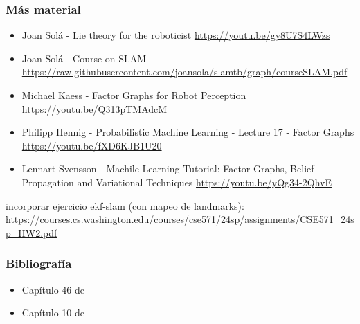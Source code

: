 \begin{frame}
    \frametitle{Más material}
    
    \begin{itemize}
        \item Joan Solá - Lie theory for the roboticist \url{https://youtu.be/gy8U7S4LWzs}
        \item Joan Solá - Course on SLAM \url{https://raw.githubusercontent.com/joansola/slamtb/graph/courseSLAM.pdf}
        \item Michael Kaess - Factor Graphs for Robot Perception \url{https://youtu.be/Q313pTMAdcM}
        \item Philipp Hennig - Probabilistic Machine Learning - Lecture 17 - Factor Graphs \url{https://youtu.be/fXD6KJB1U20}
        \item Lennart Svensson - Machile Learning Tutorial: Factor Graphs, Belief Propagation and Variational Techniques \url{https://youtu.be/yQg34-2QhvE}
    \end{itemize}

    \alert{incorporar ejercicio ekf-slam (con mapeo de landmarks): \url{https://courses.cs.washington.edu/courses/cse571/24sp/assignments/CSE571_24sp_HW2.pdf}}

    
\end{frame}

\begin{frame}
	\frametitle{Bibliografía}
    
    \begin{itemize}
        \item Capítulo 46 de \cite{siciliano2016handbook}
        \item Capítulo 10 de \cite{thrun2005probabilistic}
    \end{itemize}    

    \nocite{grisetti2010tutorial}
    \nocite{chebrolu2021adaptive}
    \nocite{dellaert2017factor}
    \nocite{carlone2025slamhandbook}

	
	\printbibliography
	
\end{frame}